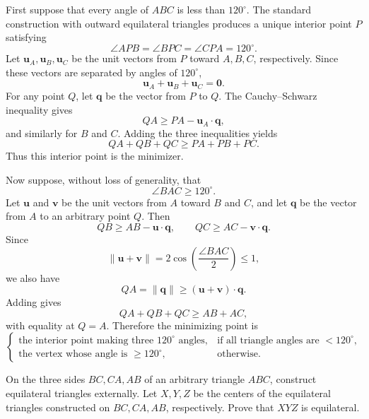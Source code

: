     \begin{solution}
        First suppose that every angle of $ABC$ is less than $120^\circ$. The
        standard construction with outward equilateral triangles produces a
        unique interior point $P$ satisfying
        \[
            \angle APB
            =
            \angle BPC
            =
            \angle CPA
            =120^\circ.
        \]
        Let $\mathbf{u}_A,\mathbf{u}_B,\mathbf{u}_C$ be the unit vectors from
        $P$ toward $A,B,C$, respectively. Since these vectors are separated by
        angles of $120^\circ$,
        \[
            \mathbf{u}_A+\mathbf{u}_B+\mathbf{u}_C=\mathbf{0}.
        \]
        For any point $Q$, let $\mathbf{q}$ be the vector from $P$ to $Q$.
        The Cauchy--Schwarz inequality gives
        \[
            QA\geq PA-\mathbf{u}_A\cdot\mathbf{q},
        \]
        and similarly for $B$ and $C$. Adding the three inequalities yields
        \[
            QA+QB+QC\geq PA+PB+PC.
        \]
        Thus this interior point is the minimizer.

        Now suppose, without loss of generality, that
        \[
            \angle BAC\geq120^\circ.
        \]
        Let $\mathbf{u}$ and $\mathbf{v}$ be the unit vectors from $A$ toward
        $B$ and $C$, and let $\mathbf{q}$ be the vector from $A$ to an arbitrary
        point $Q$. Then
        \[
            QB\geq AB-\mathbf{u}\cdot\mathbf{q},
            \qquad
            QC\geq AC-\mathbf{v}\cdot\mathbf{q}.
        \]
        Since
        \[
            \|\mathbf{u}+\mathbf{v}\|
            =
            2\cos\left(\frac{\angle BAC}{2}\right)
            \leq1,
        \]
        we also have
        \[
            QA=\|\mathbf{q}\|
            \geq
            (\mathbf{u}+\mathbf{v})\cdot\mathbf{q}.
        \]
        Adding gives
        \[
            QA+QB+QC\geq AB+AC,
        \]
        with equality at $Q=A$. Therefore the minimizing point is
        \[
            \boxed{
                \begin{cases}
                    \text{the interior point making three }120^\circ
                    \text{ angles},
                    & \text{if all triangle angles are }<120^\circ,\\
                    \text{the vertex whose angle is }\geq120^\circ,
                    & \text{otherwise}.
                \end{cases}
            }
        \]
    \end{solution}

    \begin{expectedproblem}
        On the three sides $BC,CA,AB$ of an arbitrary triangle $ABC$, construct
        equilateral triangles externally. Let $X,Y,Z$ be the centers of the
        equilateral triangles constructed on $BC,CA,AB$, respectively. Prove
        that $XYZ$ is equilateral.
    \end{expectedproblem}

